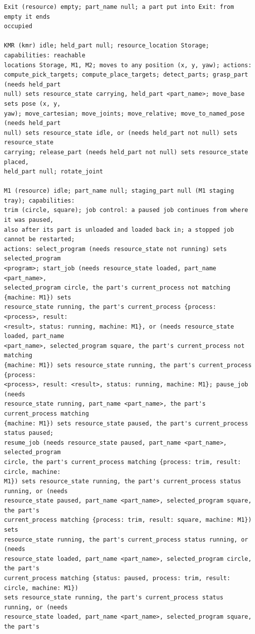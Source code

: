 \documentclass[preprint,12pt,authoryear]{elsarticle}
\begin{document}
\begin{lstlisting}[style=recorded]
Exit (resource) empty; part_name null; a part put into Exit: from empty it ends
occupied

KMR (kmr) idle; held_part null; resource_location Storage; capabilities: reachable
locations Storage, M1, M2; moves to any position (x, y, yaw); actions:
compute_pick_targets; compute_place_targets; detect_parts; grasp_part (needs held_part
null) sets resource_state carrying, held_part <part_name>; move_base sets pose (x, y,
yaw); move_cartesian; move_joints; move_relative; move_to_named_pose (needs held_part
null) sets resource_state idle, or (needs held_part not null) sets resource_state
carrying; release_part (needs held_part not null) sets resource_state placed,
held_part null; rotate_joint

M1 (resource) idle; part_name null; staging_part null (M1 staging tray); capabilities:
trim (circle, square); job control: a paused job continues from where it was paused,
also after its part is unloaded and loaded back in; a stopped job cannot be restarted;
actions: select_program (needs resource_state not running) sets selected_program
<program>; start_job (needs resource_state loaded, part_name <part_name>,
selected_program circle, the part's current_process not matching {machine: M1}) sets
resource_state running, the part's current_process {process: <process>, result:
<result>, status: running, machine: M1}, or (needs resource_state loaded, part_name
<part_name>, selected_program square, the part's current_process not matching
{machine: M1}) sets resource_state running, the part's current_process {process:
<process>, result: <result>, status: running, machine: M1}; pause_job (needs
resource_state running, part_name <part_name>, the part's current_process matching
{machine: M1}) sets resource_state paused, the part's current_process status paused;
resume_job (needs resource_state paused, part_name <part_name>, selected_program
circle, the part's current_process matching {process: trim, result: circle, machine:
M1}) sets resource_state running, the part's current_process status running, or (needs
resource_state paused, part_name <part_name>, selected_program square, the part's
current_process matching {process: trim, result: square, machine: M1}) sets
resource_state running, the part's current_process status running, or (needs
resource_state loaded, part_name <part_name>, selected_program circle, the part's
current_process matching {status: paused, process: trim, result: circle, machine: M1})
sets resource_state running, the part's current_process status running, or (needs
resource_state loaded, part_name <part_name>, selected_program square, the part's

\end{lstlisting}
\end{document}
